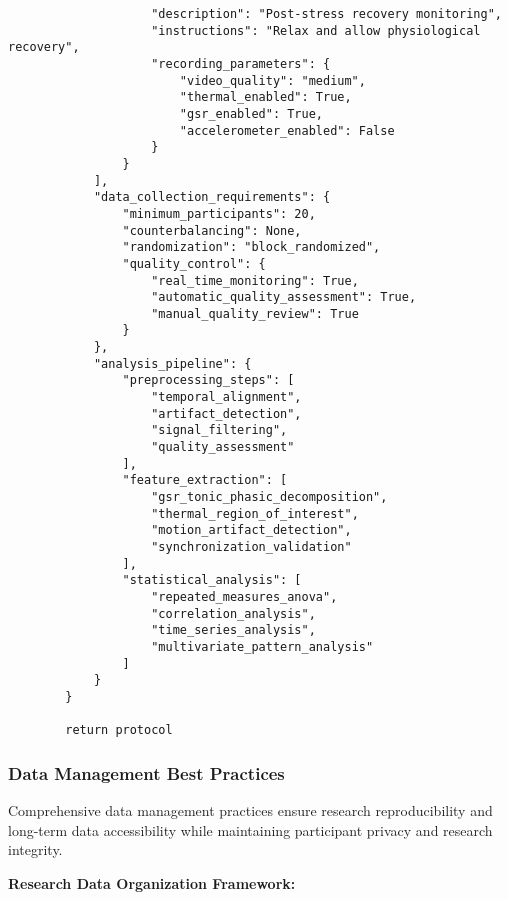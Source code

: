 \documentclass[11pt,a4paper]{article}
\begin{document}
\begin{verbatim}
                    "description": "Post-stress recovery monitoring",
                    "instructions": "Relax and allow physiological recovery",
                    "recording_parameters": {
                        "video_quality": "medium",
                        "thermal_enabled": True,
                        "gsr_enabled": True,
                        "accelerometer_enabled": False
                    }
                }
            ],
            "data_collection_requirements": {
                "minimum_participants": 20,
                "counterbalancing": None,
                "randomization": "block_randomized",
                "quality_control": {
                    "real_time_monitoring": True,
                    "automatic_quality_assessment": True,
                    "manual_quality_review": True
                }
            },
            "analysis_pipeline": {
                "preprocessing_steps": [
                    "temporal_alignment",
                    "artifact_detection",
                    "signal_filtering",
                    "quality_assessment"
                ],
                "feature_extraction": [
                    "gsr_tonic_phasic_decomposition",
                    "thermal_region_of_interest",
                    "motion_artifact_detection",
                    "synchronization_validation"
                ],
                "statistical_analysis": [
                    "repeated_measures_anova",
                    "correlation_analysis",
                    "time_series_analysis",
                    "multivariate_pattern_analysis"
                ]
            }
        }

        return protocol
\end{verbatim}

\subsubsection{Data Management Best Practices}

Comprehensive data management practices ensure research reproducibility and long-term data accessibility while
maintaining participant privacy and research integrity.

\textbf{Research Data Organization Framework:}
\end{document}

